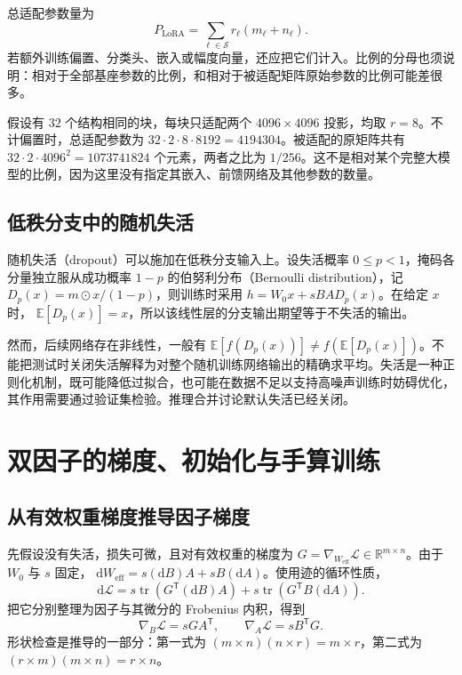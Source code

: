 \documentclass[UTF8,12pt,a4paper,fontset=fandol]{ctexart}
\begin{document}
总适配参数量为
\begin{equation}
P_{\mathrm{LoRA}}=\sum_{\ell\in\mathcal S}
r_\ell(m_\ell+n_\ell).
\label{eq:parameter-count}
\end{equation}
若额外训练偏置、分类头、嵌入或幅度向量，还应把它们计入。比例的分母也须说明：相对于全部基座参数的比例，和相对于被适配矩阵原始参数的比例可能差很多。

\begin{example}[同样秩下的单层与整网预算]
假设有 $32$ 个结构相同的块，每块只适配两个 $4096\times4096$ 投影，均取 $r=8$。不计偏置时，总适配参数为
$32\cdot2\cdot8\cdot8192=4194304$。被适配的原矩阵共有
$32\cdot2\cdot4096^2=1073741824$ 个元素，两者之比为 $1/256$。这不是相对某个完整大模型的比例，因为这里没有指定其嵌入、前馈网络及其他参数的数量。
\end{example}

\subsection{低秩分支中的随机失活}

随机失活（dropout）可以施加在低秩分支输入上。设失活概率 $0\leq p<1$，掩码各分量独立服从成功概率 $1-p$ 的伯努利分布（Bernoulli distribution），记
$D_p(x)=m\odot x/(1-p)$，则训练时采用
$h=W_0x+sBA D_p(x)$。在给定 $x$ 时，
$\mathbb E[D_p(x)]=x$，所以该线性层的分支输出期望等于不失活的输出。

然而，后续网络存在非线性，一般有
$\mathbb E[f(D_p(x))]\neq f(\mathbb E[D_p(x)])$。不能把测试时关闭失活解释为对整个随机训练网络输出的精确求平均。失活是一种正则化机制，既可能降低过拟合，也可能在数据不足以支持高噪声训练时妨碍优化，其作用需要通过验证集检验。推理合并讨论默认失活已经关闭。

\section{双因子的梯度、初始化与手算训练}
\label{sec:lora-gradient}

\subsection{从有效权重梯度推导因子梯度}

先假设没有失活，损失可微，且对有效权重的梯度为
$G=\nabla_{W_{\mathrm{eff}}}\mathcal L\in\mathbb R^{m\times n}$。由于 $W_0$ 与 $s$ 固定，
$\mathrm dW_{\mathrm{eff}}=s(\mathrm dB)A+sB(\mathrm dA)$。使用迹的循环性质，
\[
\mathrm d\mathcal L
=s\operatorname{tr}(G^{\mathsf T}(\mathrm dB)A)
+s\operatorname{tr}(G^{\mathsf T}B(\mathrm dA)).
\]
把它分别整理为因子与其微分的 Frobenius 内积，得到
\begin{equation}
\nabla_B\mathcal L=sGA^{\mathsf T},\qquad
\nabla_A\mathcal L=sB^{\mathsf T}G.
\label{eq:factor-gradients}
\end{equation}
形状检查是推导的一部分：第一式为 $(m\times n)(n\times r)=m\times r$，第二式为 $(r\times m)(m\times n)=r\times n$。
\end{document}
